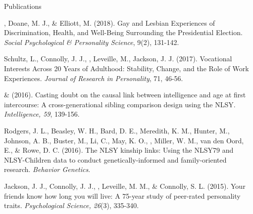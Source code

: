 \begin{rSection}{\textrm{Publications}}
\begin{etaremune}
%
\item\meb, Doane, M. J., \& Elliott, M. (2018). Gay and Lesbian Experiences of Discrimination, Health, and Well-Being Surrounding the Presidential Election. \textit{Social Psychological \& Personality Science}, 9(2), 131-142. 
%
\item Schultz, L., Connolly, J. J., \meb, Leveille, M., Jackson, J. J. (2017). Vocational Interests Across 20 Years of Adulthood: Stability, Change, and the Role of Work Experiences. \textit{Journal of Research in Personality}, 71, 46-56.
\item \meb \& \Joe (2016). Casting doubt on the causal link between intelligence and age at first intercourse: A cross-generational sibling comparison design using the NLSY. \textit{Intelligence, 59}, 139-156. 
%
\item Rodgers, J. L., Beasley, W. H., Bard, D. E., Meredith, K. M., Hunter, M., Johnson, A. B., Buster, M., Li, C., May, K. O., \meb, Miller, W. M., van den Oord, E., \& Rowe, D. C. (2016). The NLSY kinship links: Using the NLSY79 and NLSY-Children data to conduct genetically-informed and family-oriented research. \textit{Behavior Genetics}. 
%
\item Jackson, J. J., Connolly, J. J., \meb, Leveille, M. M., \& Connolly, S. L. (2015). Your friends know how long you will live: A 75-year study of peer-rated personality traits. \textit{Psychological Science, 26}(3), 335-340. 
%
\end{etaremune}\end{rSection}%
